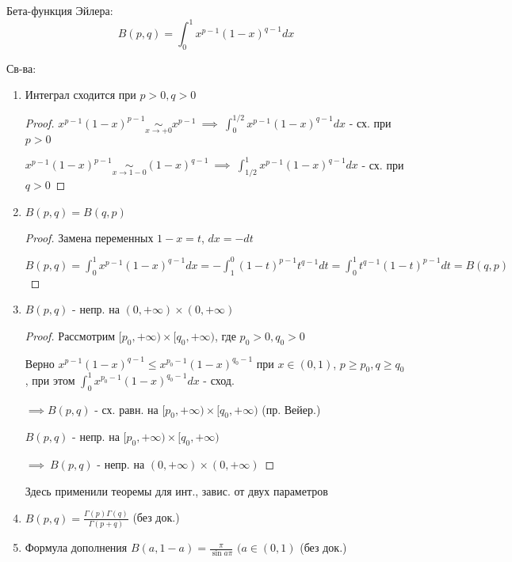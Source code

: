 \documentclass{article}
\begin{document}
\begin{definition}
  Бета-функция Эйлера:
  \[
    B(p,q)=\int_{0}^{1}x^{p-1}(1-x)^{q-1}dx
  \]
\end{definition}
Св-ва:
\begin{enumerate}
  \item Интеграл сходится при $p>0,q>0$
    \begin{proof}
      \phantom{.}

      $x^{p-1}(1-x)^{p-1}\underset{x\to +0}{\sim} x^{p-1} \ \implies \ \int_{0}^{1/2}x^{p-1}(1-x)^{q-1}dx$ - сх. при $p>0$

      $x^{p-1}(1-x)^{p-1}\underset{x\to 1-0}{\sim} (1-x)^{q-1} \ \implies \ \int_{1/2}^{1}x^{p-1}(1-x)^{q-1}dx$ - сх. при $q>0$
    \end{proof}
  \item $B(p,q)=B(q,p)$
    \begin{proof}
      \phantom{.}

      Замена переменных $1-x=t$, $dx=-dt$

      $B(p,q)=\int_{0}^{1}x^{p-1}(1-x)^{q-1}dx=-\int_{1}^{0}(1-t)^{p-1}t^{q-1}dt=\int_{0}^{1}t^{q-1}(1-t)^{p-1}dt=B(q,p)$
    \end{proof}
  \item $B(p,q)$ - непр. на $(0,+\infty)\times(0,+\infty)$
    \begin{proof}
      \phantom{.}

      Рассмотрим $[p_0,+\infty)\times[q_0,+\infty)$, где $p_0>0,q_0>0$

      Верно $x^{p-1}(1-x)^{q-1} \le x^{p_0-1}(1-x)^{q_0-1}$ при $x \in (0,1)$, $p\ge p_0, q \ge q_0$,
      при этом $\int_{0}^{1}x^{p_0-1}(1-x)^{q_0-1}dx$ - сход.

      $\implies B(p,q)$ - сх. равн. на $[p_0,+\infty)\times [q_0,+\infty)$ (пр. Вейер.)

      $B(p,q)$ - непр. на $[p_0,+\infty)\times [q_0,+\infty)$
      
      $\implies \ B(p,q)$ - непр. на $(0,+\infty)\times(0,+\infty)$
    \end{proof}
    \begin{remark}
      Здесь применили теоремы для инт., завис. от двух параметров
    \end{remark}
  \item $B(p,q)=\frac{\Gamma(p)\Gamma(q)}{\Gamma(p+q)}$ (без док.)
  \item Формула дополнения $B(a,1-a)=\frac{\pi}{\sin a\pi}$ $(a\in(0,1)$ (без док.)
  
\end{enumerate}
\end{document}
